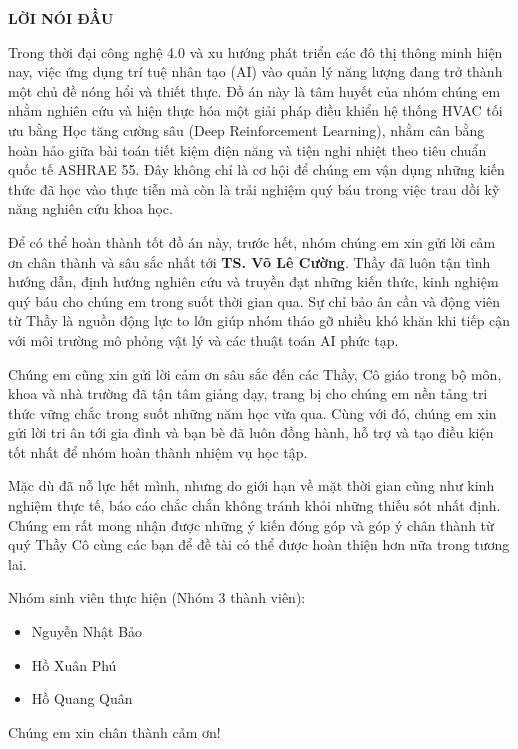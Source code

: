 \begin{center}
    \LARGE \textbf{LỜI NÓI ĐẦU}
\end{center}
\vspace{0.5cm}

Trong thời đại công nghệ 4.0 và xu hướng phát triển các đô thị thông minh hiện nay, việc ứng dụng trí tuệ nhân tạo (AI) vào quản lý năng lượng đang trở thành một chủ đề nóng hổi và thiết thực. Đồ án này là tâm huyết của nhóm chúng em nhằm nghiên cứu và hiện thực hóa một giải pháp điều khiển hệ thống HVAC tối ưu bằng Học tăng cường sâu (Deep Reinforcement Learning), nhằm cân bằng hoàn hảo giữa bài toán tiết kiệm điện năng và tiện nghi nhiệt theo tiêu chuẩn quốc tế ASHRAE 55. Đây không chỉ là cơ hội để chúng em vận dụng những kiến thức đã học vào thực tiễn mà còn là trải nghiệm quý báu trong việc trau dồi kỹ năng nghiên cứu khoa học.

Để có thể hoàn thành tốt đồ án này, trước hết, nhóm chúng em xin gửi lời cảm ơn chân thành và sâu sắc nhất tới \textbf{TS. Võ Lê Cường}. Thầy đã luôn tận tình hướng dẫn, định hướng nghiên cứu và truyền đạt những kiến thức, kinh nghiệm quý báu cho chúng em trong suốt thời gian qua. Sự chỉ bảo ân cần và động viên từ Thầy là nguồn động lực to lớn giúp nhóm tháo gỡ nhiều khó khăn khi tiếp cận với môi trường mô phỏng vật lý và các thuật toán AI phức tạp.

Chúng em cũng xin gửi lời cảm ơn sâu sắc đến các Thầy, Cô giáo trong bộ môn, khoa và nhà trường đã tận tâm giảng dạy, trang bị cho chúng em nền tảng tri thức vững chắc trong suốt những năm học vừa qua. Cùng với đó, chúng em xin gửi lời tri ân tới gia đình và bạn bè đã luôn đồng hành, hỗ trợ và tạo điều kiện tốt nhất để nhóm hoàn thành nhiệm vụ học tập.

Mặc dù đã nỗ lực hết mình, nhưng do giới hạn về mặt thời gian cũng như kinh nghiệm thực tế, báo cáo chắc chắn không tránh khỏi những thiếu sót nhất định. Chúng em rất mong nhận được những ý kiến đóng góp và góp ý chân thành từ quý Thầy Cô cùng các bạn để đề tài có thể được hoàn thiện hơn nữa trong tương lai.

Nhóm sinh viên thực hiện (Nhóm 3 thành viên):
\begin{itemize}
    \item Nguyễn Nhật Bảo
    \item Hồ Xuân Phú
    \item Hồ Quang Quân
\end{itemize}

Chúng em xin chân thành cảm ơn!
\cleardoublepage